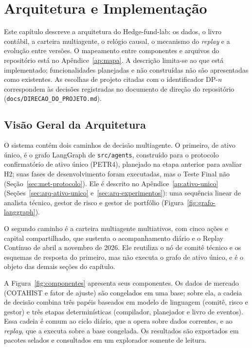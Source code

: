 \chapter{Arquitetura e Implementação}
\label{cha:arquitetura}

Este capítulo descreve a arquitetura do Hedge-fund-lab: os dados, o livro contábil, a carteira multiagente, o relógio causal, o mecanismo do \textit{replay} e a evolução entre versões. O mapeamento entre componentes e arquivos do repositório está no Apêndice~\ref{ap:mapa}. A descrição limita-se ao que está implementado; funcionalidades planejadas e não construídas não são apresentadas como existentes. As escolhas de projeto citadas com o identificador \mbox{DP-$n$} correspondem às decisões registradas no documento de direção do repositório (\texttt{docs/DIRECAO\_DO\_PROJETO.md}).

\section{Visão Geral da Arquitetura}
\label{sec:arq-visao}

O sistema contém dois caminhos de decisão multiagente. O primeiro, de ativo único, é o grafo LangGraph de \texttt{src/agents}, construído para o protocolo confirmatório de ativo único (PETR4), planejado na etapa anterior para avaliar H2; suas fases de desenvolvimento foram executadas, mas o Teste Final não (Seção~\ref{sec:met-protocolo}). Ele é descrito no Apêndice~\ref{ap:ativo-unico} (Seções~\ref{sec:arq-ativo-unico} e~\ref{sec:arq-experimentos}): uma sequência linear de analista técnico, gestor de risco e gestor de portfólio (Figura~\ref{fig:grafo-langgraph}).

O segundo caminho é a carteira multiagente multiativos, com cinco ações e capital compartilhado, que sustenta o acompanhamento diário e o Replay Contínuo de abril a novembro de 2026. Ele reutiliza o nó de comitê técnico e os esquemas de resposta do primeiro, mas não executa o grafo de ativo único, e é o objeto das demais seções do capítulo.

A Figura~\ref{fig:componentes} apresenta seus componentes. Os dados de mercado (COTAHIST e fator de ajuste) são congelados em uma base; sobre ela, a cadeia de decisão combina três papéis baseados em modelo de linguagem (comitê, risco e gestor) e três etapas determinísticas (compilador, planejador e livro de eventos). Essa cadeia é comum ao ciclo diário, que a opera sobre dados correntes, e ao \textit{replay}, que a executa sobre a base congelada. Os resultados são exportados em pacotes selados e consultados em um explorador somente de leitura.

